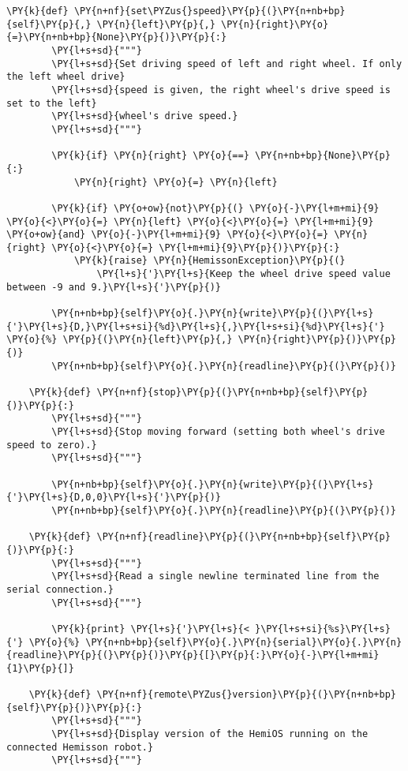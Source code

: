 \begin{Verbatim}[commandchars=\\\{\}]
    \PY{k}{def} \PY{n+nf}{set\PYZus{}speed}\PY{p}{(}\PY{n+nb+bp}{self}\PY{p}{,} \PY{n}{left}\PY{p}{,} \PY{n}{right}\PY{o}{=}\PY{n+nb+bp}{None}\PY{p}{)}\PY{p}{:}
        \PY{l+s+sd}{"""}
        \PY{l+s+sd}{Set driving speed of left and right wheel. If only the left wheel drive}
        \PY{l+s+sd}{speed is given, the right wheel's drive speed is set to the left}
        \PY{l+s+sd}{wheel's drive speed.}
        \PY{l+s+sd}{"""}

        \PY{k}{if} \PY{n}{right} \PY{o}{==} \PY{n+nb+bp}{None}\PY{p}{:}
            \PY{n}{right} \PY{o}{=} \PY{n}{left}

        \PY{k}{if} \PY{o+ow}{not}\PY{p}{(} \PY{o}{-}\PY{l+m+mi}{9} \PY{o}{<}\PY{o}{=} \PY{n}{left} \PY{o}{<}\PY{o}{=} \PY{l+m+mi}{9} \PY{o+ow}{and} \PY{o}{-}\PY{l+m+mi}{9} \PY{o}{<}\PY{o}{=} \PY{n}{right} \PY{o}{<}\PY{o}{=} \PY{l+m+mi}{9}\PY{p}{)}\PY{p}{:}
            \PY{k}{raise} \PY{n}{HemissonException}\PY{p}{(}
                \PY{l+s}{'}\PY{l+s}{Keep the wheel drive speed value between -9 and 9.}\PY{l+s}{'}\PY{p}{)}

        \PY{n+nb+bp}{self}\PY{o}{.}\PY{n}{write}\PY{p}{(}\PY{l+s}{'}\PY{l+s}{D,}\PY{l+s+si}{%d}\PY{l+s}{,}\PY{l+s+si}{%d}\PY{l+s}{'} \PY{o}{%} \PY{p}{(}\PY{n}{left}\PY{p}{,} \PY{n}{right}\PY{p}{)}\PY{p}{)}
        \PY{n+nb+bp}{self}\PY{o}{.}\PY{n}{readline}\PY{p}{(}\PY{p}{)}

    \PY{k}{def} \PY{n+nf}{stop}\PY{p}{(}\PY{n+nb+bp}{self}\PY{p}{)}\PY{p}{:}
        \PY{l+s+sd}{"""}
        \PY{l+s+sd}{Stop moving forward (setting both wheel's drive speed to zero).}
        \PY{l+s+sd}{"""}

        \PY{n+nb+bp}{self}\PY{o}{.}\PY{n}{write}\PY{p}{(}\PY{l+s}{'}\PY{l+s}{D,0,0}\PY{l+s}{'}\PY{p}{)}
        \PY{n+nb+bp}{self}\PY{o}{.}\PY{n}{readline}\PY{p}{(}\PY{p}{)}

    \PY{k}{def} \PY{n+nf}{readline}\PY{p}{(}\PY{n+nb+bp}{self}\PY{p}{)}\PY{p}{:}
        \PY{l+s+sd}{"""}
        \PY{l+s+sd}{Read a single newline terminated line from the serial connection.}
        \PY{l+s+sd}{"""}

        \PY{k}{print} \PY{l+s}{'}\PY{l+s}{< }\PY{l+s+si}{%s}\PY{l+s}{'} \PY{o}{%} \PY{n+nb+bp}{self}\PY{o}{.}\PY{n}{serial}\PY{o}{.}\PY{n}{readline}\PY{p}{(}\PY{p}{)}\PY{p}{[}\PY{p}{:}\PY{o}{-}\PY{l+m+mi}{1}\PY{p}{]}

    \PY{k}{def} \PY{n+nf}{remote\PYZus{}version}\PY{p}{(}\PY{n+nb+bp}{self}\PY{p}{)}\PY{p}{:}
        \PY{l+s+sd}{"""}
        \PY{l+s+sd}{Display version of the HemiOS running on the connected Hemisson robot.}
        \PY{l+s+sd}{"""}


\end{Verbatim}
